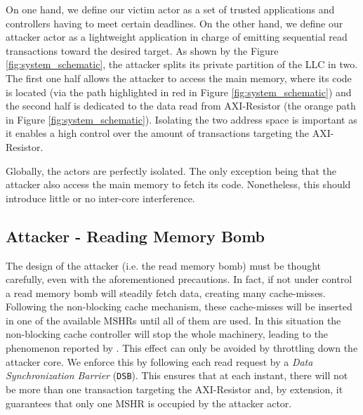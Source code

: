         On one hand, we define our victim actor as a set of trusted applications and controllers having to meet certain deadlines.
        On the other hand, we define our attacker actor as a lightweight application in charge of emitting sequential read transactions toward the desired target.
        As shown by the Figure \ref{fig:system_schematic}, the attacker splits its private partition of the LLC in two.
        The first one half allows the attacker to access the main memory, where its code is located (via the path highlighted in red in Figure \ref{fig:system_schematic}) and the second half is dedicated to the data read from AXI-Resistor (the orange path in Figure \ref{fig:system_schematic}).
        Isolating the two address space is important as it enables a high control over the amount of transactions targeting the AXI-Resistor.

        Globally, the actors are perfectly isolated.
        The only exception being that the attacker also access the main memory to fetch its code.
        Nonetheless, this should introduce little or no inter-core interference.

    \subsection{Attacker - Reading Memory Bomb}
        \label{subsec:attacker_reading_memory_bomb}
        The design of the attacker (i.e. the read memory bomb) must be thought carefully, even with the aforementioned precautions.
        In fact, if not under control a read memory bomb will steadily fetch data, creating many cache-misses.
        Following the non-blocking cache mechanism, these cache-misses will be inserted in one of the available MSHRs until all of them are used.
        In this situation the non-blocking cache controller will stop the whole machinery, leading to the phenomenon reported by \cite{Heechul_DDOS_attacks_on_shared_cache}.
        This effect can only be avoided by throttling down the attacker core.
        We enforce this by following each read request by a \emph{Data Synchronization Barrier} (\texttt{DSB}).
        This ensures that at each instant, there will not be more than one transaction targeting the AXI-Resistor and, by extension, it guarantees that only one MSHR is occupied by the attacker actor.

